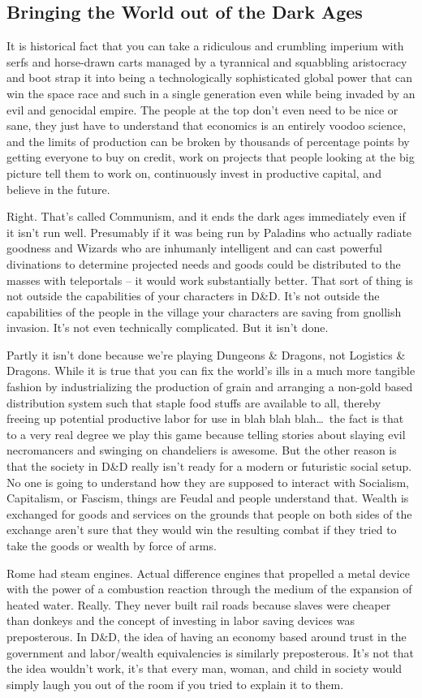 \subsection{Bringing the World out of the Dark Ages}

It is historical fact that you can take a ridiculous and crumbling imperium with serfs and horse-drawn carts managed by a tyrannical and squabbling aristocracy and boot strap it into being a technologically sophisticated global power that can win the space race and such in a single generation even while being invaded by an evil and genocidal empire. The people at the top don't even need to be nice or sane, they just have to understand that economics is an entirely voodoo science, and the limits of production can be broken by thousands of percentage points by getting everyone to buy on credit, work on projects that people looking at the big picture tell them to work on, continuously invest in productive capital, and believe in the future.

Right. That's called Communism, and it ends the dark ages immediately even if it isn't run well. Presumably if it was being run by Paladins who actually radiate goodness and Wizards who are inhumanly intelligent and can cast powerful divinations to determine projected needs and goods could be distributed to the masses with teleportals -- it would work substantially better. That sort of thing is not outside the capabilities of your characters in D\&D. It's not outside the capabilities of the people in the village your characters are saving from gnollish invasion. It's not even technically complicated. But it isn't done.

Partly it isn't done because we're playing Dungeons \& Dragons, not Logistics \& Dragons. While it is true that you can fix the world's ills in a much more tangible fashion by industrializing the production of grain and arranging a non-gold based distribution system such that staple food stuffs are available to all, thereby freeing up potential productive labor for use in blah blah blah\ldots\  the fact is that to a very real degree we play this game because telling stories about slaying evil necromancers and swinging on chandeliers is awesome. But the other reason is that the society in D\&D really isn't ready for a modern or futuristic social setup. No one is going to understand how they are supposed to interact with Socialism, Capitalism, or Fascism, things are Feudal and people understand that. Wealth is exchanged for goods and services on the grounds that people on both sides of the exchange aren't sure that they would win the resulting combat if they tried to take the goods or wealth by force of arms.

Rome had steam engines. Actual difference engines that propelled a metal device with the power of a combustion reaction through the medium of the expansion of heated water. Really. They never built rail roads because slaves were cheaper than donkeys and the concept of investing in labor saving devices was preposterous. In D\&D, the idea of having an economy based around trust in the government and labor/wealth equivalencies is similarly preposterous. It's not that the idea wouldn't work, it's that every man, woman, and child in society would simply laugh you out of the room if you tried to explain it to them.

